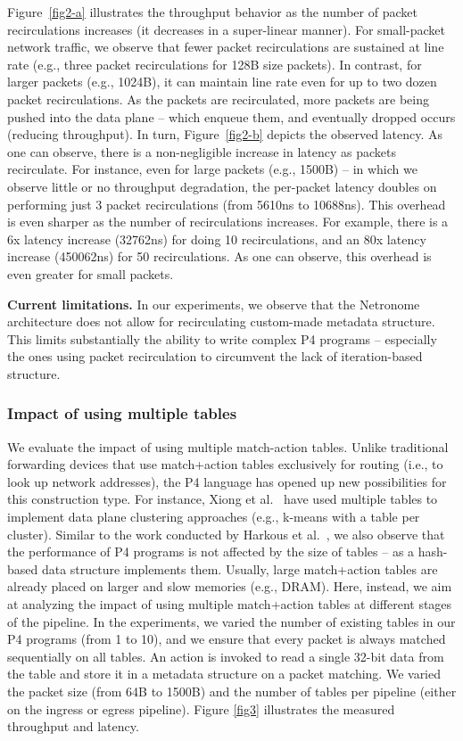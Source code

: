 Figure~\ref{fig2-a} illustrates the throughput behavior as the number of packet recirculations increases (it decreases in a super-linear manner). For small-packet network traffic, we observe that fewer packet recirculations are sustained at line rate (e.g., three packet recirculations for 128B size packets). In contrast, for larger packets (e.g., 1024B), it can maintain line rate even for up to two dozen packet recirculations. As the packets are recirculated, more packets are being pushed into the data plane -- which enqueue them, and eventually dropped occurs (reducing throughput). In turn, Figure~\ref{fig2-b} depicts the observed latency. As one can observe, there is a non-negligible increase in latency as packets recirculate. For instance, even for large packets (e.g., 1500B) -- in which we observe little or no throughput degradation, the per-packet latency doubles on performing just $3$ packet recirculations (from 5610ns to 10688ns). This overhead is even sharper as the number of recirculations increases. For example, there is a 6x latency increase (32762ns) for doing 10 recirculations, and an 80x latency increase (450062ns) for 50 recirculations. As one can observe, this overhead is even greater for small packets.

\noindent \textbf{Current limitations.} In our experiments, we observe that the Netronome architecture does not allow for recirculating custom-made metadata structure. This limits substantially the ability to write complex P4 programs -- especially the ones using packet recirculation to circumvent the lack of iteration-based structure.


\subsubsection{Impact of using multiple tables}

We  evaluate  the  impact  of  using multiple match-action tables. Unlike traditional forwarding devices that use match+action tables exclusively for routing (i.e., to look up network addresses), the P4 language has opened up new possibilities for this construction type. For instance, Xiong et al.~\cite{xiong2019switches} have used multiple tables to implement data plane clustering approaches (e.g., k-means with a table per cluster). Similar to the work conducted by Harkous et al.~\cite{harkous2019towards}, we also observe that the performance of P4 programs is not affected by the size of tables -- as a hash-based data structure implements them. Usually, large match+action tables are already placed on larger and slow memories (e.g., DRAM). Here, instead, we aim at analyzing the impact of using multiple match+action tables at different stages of the pipeline. In the experiments, we varied the number of existing tables in our P4 programs (from 1 to 10), and we ensure that every packet is always matched sequentially on all tables. An action is invoked to read a single 32-bit data from the table and store it in a metadata structure on a packet matching. We varied the packet size (from 64B to 1500B) and the number of tables per pipeline (either on the ingress or egress pipeline). Figure \ref{fig3} illustrates the measured throughput and latency. 

